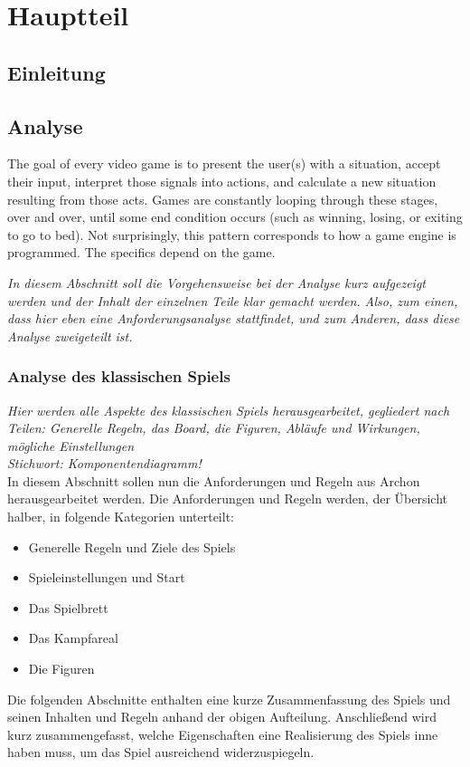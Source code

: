 \chapter{Hauptteil}
\label{cha:Hauptteil}

\section{Einleitung}

\section{Analyse}
\label{sec:analyse}

The goal of every video game is to present the user(s) with a situation, accept their input, interpret those signals into actions, and calculate a new situation resulting from those acts. Games are constantly looping through these stages, over and over, until some end condition occurs (such as winning, losing, or exiting to go to bed). Not surprisingly, this pattern corresponds to how a game engine is programmed. The specifics depend on the game. \cite{https://developer.mozilla.org/en-us/docs/games/anatomy}

\emph{In diesem Abschnitt soll die Vorgehensweise bei der Analyse kurz aufgezeigt werden und der Inhalt der einzelnen Teile klar gemacht werden. Also, zum einen, dass hier eben eine Anforderungsanalyse stattfindet, und zum Anderen, dass diese Analyse zweigeteilt ist.}

\subsection{Analyse des klassischen Spiels}
\label{subsec:spiel_analyse}

\emph{Hier werden alle Aspekte des klassischen Spiels herausgearbeitet, gegliedert nach Teilen: Generelle Regeln, das Board, die Figuren, Abläufe und Wirkungen, mögliche Einstellungen\\Stichwort: Komponentendiagramm!}
\\In diesem Abschnitt sollen nun die Anforderungen und Regeln aus Archon herausgearbeitet werden. Die Anforderungen und Regeln werden, der Übersicht halber, in folgende Kategorien unterteilt: 
\begin{itemize}
	\item Generelle Regeln und Ziele des Spiels
	\item Spieleinstellungen und Start
	\item Das Spielbrett
	\item Das Kampfareal
	\item Die Figuren
\end{itemize}
Die folgenden Abschnitte enthalten eine kurze Zusammenfassung des Spiels und seinen Inhalten und Regeln anhand der obigen Aufteilung. Anschließend wird kurz zusammengefasst, welche Eigenschaften eine Realisierung des Spiels inne haben muss, um das Spiel ausreichend widerzuspiegeln. 
